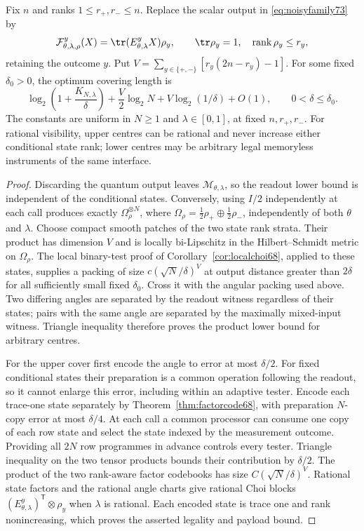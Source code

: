 \begin{corollary}\label{cor:noisypreparation73}
Fix $n$ and ranks $1\le r_+,r_-\le n$. Replace the scalar output in
\eqref{eq:noisyfamily73} by
\[
 \mathcal F_{\theta,\lambda,\rho}^{y}(X)
             =\tr(E_{\theta,\lambda}^{y}X)\rho_y,\qquad
 \tr\rho_y=1,\quad\operatorname{rank}\rho_y\le r_y,
\]
retaining the outcome $y$. Put
$V=\sum_{y\in\{+,-\}}[r_y(2n-r_y)-1]$.
For some fixed $\delta_0>0$, the optimum covering length is
\begin{equation}\label{eq:noisyprepbits73}
 \log_2\left(1+\frac{K_{N,\lambda}}\delta\right)
       +\frac V2\log_2N+V\log_2(1/\delta)+O(1),
 \qquad 0<\delta\le\delta_0.
\end{equation}
The constants are uniform in $N\ge1$ and $\lambda\in[0,1]$, at fixed
$n,r_+,r_-$. For rational visibility, upper centres can be rational and never
increase either conditional state rank; lower centres may be arbitrary legal
memoryless instruments of the same interface.
\end{corollary}
\begin{proof}
Discarding the quantum output leaves $\mathcal M_{\theta,\lambda}$,
so the readout lower bound is independent of the conditional states.
Conversely, using $I/2$ independently at each call produces exactly
$\Omega_\rho^{\otimes N}$, where
$\Omega_\rho=\tfrac12\rho_+\oplus\tfrac12\rho_-$, independently of
both $\theta$ and $\lambda$. Choose compact smooth patches of the two
state rank strata. Their product has dimension $V$ and is locally
bi-Lipschitz in the Hilbert--Schmidt metric on $\Omega_\rho$.
The local binary-test proof of Corollary~\ref{cor:localchoi68}, applied
to these states, supplies a packing of size
$c(\sqrt N/\delta)^V$ at output distance greater than $2\delta$ for
all sufficiently small fixed $\delta_0$. Cross it with the angular
packing used above. Two differing angles are separated by the readout
witness regardless of their states; pairs with the same angle are
separated by the maximally mixed-input witness. Triangle inequality
therefore proves the product lower bound for arbitrary centres.

For the upper cover first encode the angle to error at most $\delta/2$.
For fixed conditional states their preparation is a common operation
following the readout, so it cannot enlarge this error, including
within an adaptive tester. Encode each trace-one state separately by
Theorem~\ref{thm:factorcode68}, with preparation $N$-copy error at most
$\delta/4$. At each call a common processor can consume one copy of
each row state and select the state indexed by the measurement outcome.
Providing all $2N$ row programmes in advance controls every tester.
Triangle inequality on the two tensor products bounds their contribution
by $\delta/2$. The product of the two rank-aware factor codebooks has
size $C(\sqrt N/\delta)^V$. Rational state factors and the rational
angle charts give rational Choi blocks
$(E_{\theta,\lambda}^y)^{\mathsf T}\otimes\rho_y$ when $\lambda$
is rational. Each encoded state is trace one and rank nonincreasing,
which proves the asserted legality and payload bound.
\end{proof}


